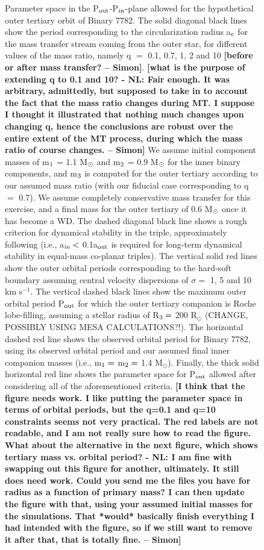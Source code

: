 \documentclass{aastex62}
\def\simon#1{{\bf {\color{red}[#1 -- Simon]}}}
\begin{document}
\begin{figure}[ht!]
\caption{Parameter space in the P$_{\rm out}$-P$_{\rm in}$-plane
  allowed for the hypothetical outer tertiary orbit of Binary 7782.
  The solid diagonal black lines show the period corresponding to the
  circularization radius a$_{\rm c}$ for the mass transfer stream
  coming from the outer star, for different values of the mass ratio,
  namely q $=$ 0.1, 0.7, 1, 2 and 10 \simon{before or after mass
    transfer?}.  \simon{what is the purpose of extending q to 0.1 and
    10? - NL: Fair enough.  It was arbitrary, admittedly, but supposed to take in to account the fact that the mass ratio changes during MT.  I suppose I thought it illustrated that nothing much changes upon changing q, hence the conclusions are robust over the entire extent of the MT process, during which the mass ratio of course changes.} We assume initial component masses of m$_{\rm 1}$ = 1.1
  M$_{\rm \odot}$ and m$_{\rm 2}$ = 0.9 M$_{\rm \odot}$ for the inner
  binary components, and m$_{\rm 3}$ is computed for the outer
  tertiary according to our assumed mass ratio (with our fiducial case
  corresponding to q $=$ 0.7).  We assume completely conservative mass
  transfer for this exercise, and a final mass for the outer tertiary
  of 0.6 M$_{\rm \odot}$ once it has become a WD.  The dashed diagonal
  black line shows a rough criterion for dynamical stability in the
  triple, approximately following \citet{mardling99} (i.e., a$_{\rm
    in} <$ 0.1a$_{\rm out}$ is required for long-term dynamical
  stability in equal-mass co-planar triples).  The vertical solid red
  lines show the outer orbital periods corresponding to the hard-soft
  boundary assuming central velocity dispersions of $\sigma =$ 1, 5
  and 10 km s$^{-1}$.  The vertical dashed black lines show the
  maximum outer orbital period P$_{\rm out}$ for which the outer
  tertiary companion is Roche lobe-filling, assuming a stellar radius
  of R$_{\rm 3} =$ 200 R$_{\odot}$ (CHANGE, POSSIBLY USING MESA
  CALCULATIONS?!).  The horizontal dashed red line shows the observed
  orbital period for Binary 7782, using its observed orbital period
  and our assumed final inner companion masses (i.e., m$_{\rm 1} =$
  m$_{\rm 2} =$ 1.4 M$_{\odot}$).  Finally, the thick solid horizontal
  red line shows the parameter space for P$_{\rm out}$ allowed after
  considering all of the aforementioned criteria.  \simon{I think that
    the figure needs work. I like putting the parameter space in terms
    of orbital periods, but the q=0.1 and q=10 constraints seems
    not very practical. The red labels are not readable, and I am not
    really sure how to read the figure. What about the alternative in
    the next figure, which shows tertiary mass vs. orbital period? - NL: I am fine with swapping out this figure for another, ultimately.  It still does need work.  Could you send me the files you have for radius as a function of primary mass?  I can then update the figure with that, using your assumed initial masses for the simulations.  That *would* basically finish everything I had intended with the figure, so if we still want to remove it after that, that is totally fine.}
\label{fig:fig2}}
\end{figure}
\end{document}
